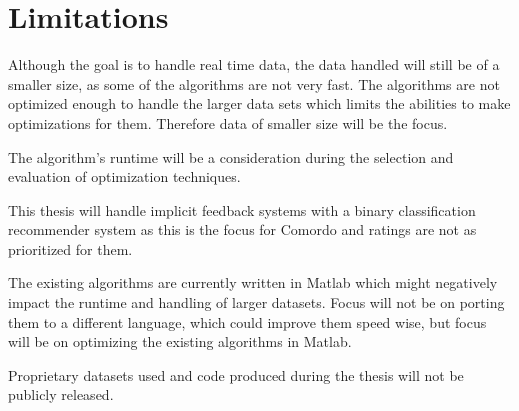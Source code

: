 
\section{Limitations}\label{sec:intro:limitations}


Although the goal is to handle real time data, the data handled will still be of a smaller size, as some of the algorithms are not very fast. The algorithms are not optimized enough to handle the larger data sets which limits the abilities to make optimizations for them. Therefore data of smaller size will be the focus.

The algorithm's runtime will be a consideration during the selection and evaluation of optimization techniques.

This thesis will handle implicit feedback systems with a binary classification recommender system as this is the focus for Comordo and ratings are not as prioritized for them.

The existing algorithms are currently written in Matlab which might negatively impact the runtime and handling of larger datasets. Focus will not be on porting them to a different language, which could improve them speed wise, but focus will be on optimizing the existing algorithms in Matlab.

Proprietary datasets used and code produced during the thesis will not be publicly released.


